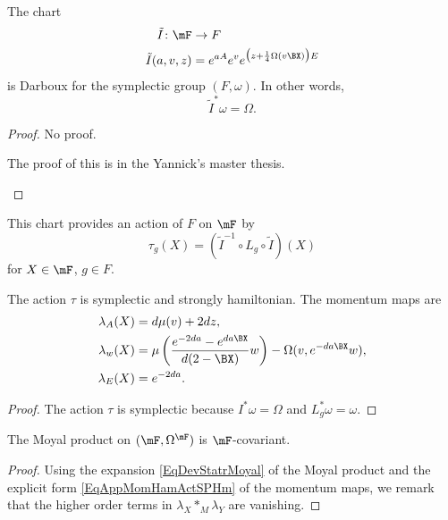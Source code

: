 \begin{proposition}
	The chart \begin{equation}
		\begin{aligned}
			\tilde I\colon \mF & \to F                                                       \\
			\tilde I(a,v,z)    & =  e^{aA} e^{v} e^{\big(z+\frac{1}{ 4 }\Omega(v\BX )\big)E}
		\end{aligned}
	\end{equation}
	is Darboux for the symplectic group $(F,\omega)$. In other words,
	\[
		\tilde I^*\omega=\Omega.
	\]
\end{proposition}
\begin{proof}
	No proof.
	\begin{probleme}
		The proof of this is in the Yannick's master thesis.
		\label{ProbMemYan}
	\end{probleme}

\end{proof}

This chart provides an action of $F$ on $\mF$ by
\[
	\tau_{g}(X)=(\tilde I^{-1}\circ L_{g}\circ \tilde I)(X)
\]
for $X\in\mF$, $g\in F$.\begin{proposition}
	The action $\tau$ is symplectic and strongly hamiltonian. The momentum maps are
	\begin{subequations}\label{EqAppMomHamActSPHm}
		\begin{align}
			\lambda_{A}(X) & =d\mu(v)+2dz,                                                                            \\
			\lambda_{w}(X) & =\mu\left( \frac{  e^{-2da}- e^{da\BX } }{ d(2-\BX ) }w \right)-\Omega(v, e^{-da\BX }w), \\
			\lambda_{E}(X) & = e^{-2da}.
		\end{align}
	\end{subequations}
\end{proposition}

\begin{proof}
	The action $\tau$ is symplectic because $I^*\omega=\Omega$ and $L_{g}^*\omega=\omega$.
\end{proof}

\begin{proposition}
	The Moyal product on $(\mF,\Omega^{\mF})$ is $\mF$-covariant.
\end{proposition}

\begin{proof}
	Using the expansion \eqref{EqDevStatrMoyal} of the Moyal product and the explicit form \eqref{EqAppMomHamActSPHm} of the momentum maps, we remark that the higher order terms in $\lambda_{X}\ast_{M}\lambda_{Y}$ are vanishing.
\end{proof}

